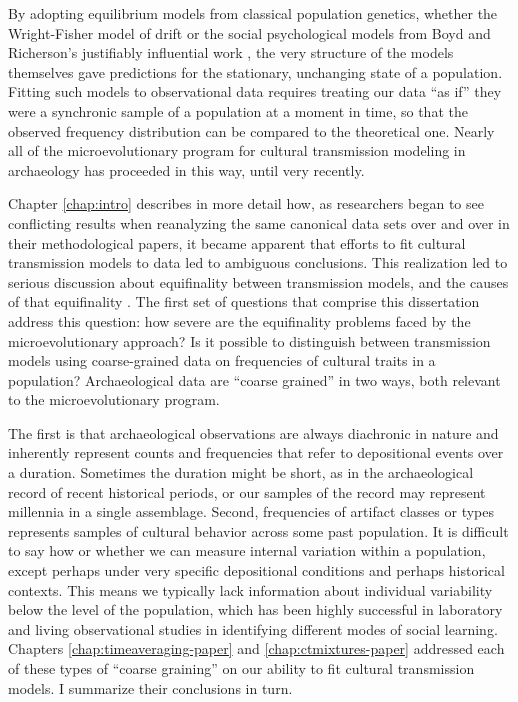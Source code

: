 By adopting equilibrium models from classical population genetics, whether the Wright-Fisher model of drift or the social psychological models from Boyd and Richerson's justifiably influential work \citeyearpar{BR1985}, the very structure of the models themselves gave predictions for the stationary, unchanging state of a population.  Fitting such models to observational data requires treating our data ``as if'' they were a synchronic sample of a population at a moment in time, so that the observed frequency distribution can be compared to the theoretical one.  Nearly all of the microevolutionary program for cultural  transmission modeling in archaeology has proceeded in this way, until very recently.  

Chapter \ref{chap:intro} describes in more detail how, as researchers began to see conflicting results when reanalyzing the same canonical data sets over and over in their methodological papers, it became apparent that efforts to fit cultural transmission models to data led to ambiguous conclusions.  This realization led to serious discussion about equifinality between transmission models, and the causes of that equifinality \citep{barrett2019equifinality,kandler2019analysing,premo2010equifinality}.  The first set of questions that comprise this dissertation address this question:  how severe are  the equifinality problems faced by the microevolutionary approach?  Is it possible to distinguish between transmission models using coarse-grained data on frequencies of cultural traits in a population?  Archaeological data are ``coarse grained'' in two ways, both relevant to the microevolutionary program. 

The first is that archaeological observations are always diachronic in nature and inherently represent counts and frequencies that refer to depositional events over a duration.  Sometimes the duration might be short, as in the archaeological record of recent historical periods, or our samples of the record may represent millennia in a single assemblage. Second, frequencies of artifact classes or types represents samples of cultural behavior across some past population.  It is difficult to say how or whether we can measure internal variation within a population, except perhaps under very specific depositional conditions and perhaps historical contexts.  This means we typically lack information about individual variability below the level of the population, which has been highly successful in laboratory and living observational studies in identifying different modes of social learning.  Chapters \ref{chap:timeaveraging-paper} and \ref{chap:ctmixtures-paper} addressed each of these types of ``coarse graining'' on our ability to fit cultural transmission models.  I summarize their conclusions in turn.

